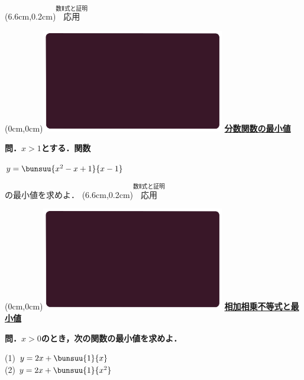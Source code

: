 \documentclass[10pt,
fleqn,
dvipdfmx,
uplatex
]{jsarticle}
\begin{document}
\at(6.6cm,0.2cm){\small\color{bradorange}$\overset{\text{数Ⅱ式と証明}}{\text{応用}}$}


\newpage



\at(0cm,0cm){\includegraphics[width=8cm,bb=0 0 1920 1080]{./youtube/thumbnails/templates/smart_background/数II式と証明.jpeg}}
{\color{orange}\bf\boldmath\huge\underline{分数関数の最小値}}\vspace{0.3zw}

\normalsize
\bf\boldmath 問．$x>1$とする．関数

\Huge 
\vspace{0.2zw}
\hspace{0.3zw}$y=\bunsuu{{x^2-x+1}}{{x-1}}$
\vspace{0.1zw}

\normalsize
\hfill の最小値を求めよ．
\at(6.6cm,0.2cm){\small\color{bradorange}$\overset{\text{数Ⅱ式と証明}}{\text{応用}}$}


\newpage



\at(0cm,0cm){\includegraphics[width=8cm,bb=0 0 1920 1080]{./youtube/thumbnails/templates/smart_background/数II式と証明.jpeg}}
{\color{orange}\bf\boldmath\LARGE\underline{相加相乗不等式と最小値}}\vspace{0.3zw}

\normalsize
\bf\boldmath 問．$x>0$のとき，次の関数の最小値を求めよ．

\LARGE
\vspace{0.1zw}
(1)  $y=2x+\bunsuu{1}{x}$\vspace{-0.3zw}\\
\huge
(2)  $y=2x+\bunsuu{1}{{}x^2}$\\
\end{document}
